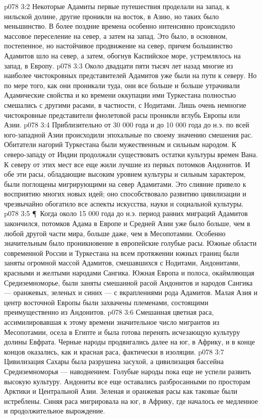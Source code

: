 \vs p078 3:2 Некоторые Адамиты первые путешествия проделали на запад, к нильской долине, другие проникли на восток, в Азию, но таких было меньшинство. В более поздние времена особенно интенсивно происходило массовое переселение на север, а затем на запад. Это было, в основном, постепенное, но настойчивое продвижение на север, причем большинство Адамитов шло на север, а затем, обогнув Каспийское море, устремлялось на запад, в Европу.
\vs p078 3:3 Около двадцати пяти тысяч лет назад многие из наиболее чистокровных представителей Адамитов уже были на пути к северу. Но по мере того, как они проникали туда, они все больше и больше утрачивали Адамические свойства и ко времени оккупации ими Туркестана полностью смешались с другими расами, в частности, с Нодитами. Лишь очень немногие чистокровные представители фиолетовой расы проникли вглубь Европы или Азии.
\vs p078 3:4 Приблизительно от 30 000 года и до 10 000 года до н.э. по всей юго\hyp{}западной Азии происходили эпохальные по своему значению смешения рас. Обитатели нагорий Туркестана были мужественным и сильным народом. К северо\hyp{}западу от Индии продолжали существовать остатки культуры времен Вана. К северу от этих мест все еще жили лучшие из первых потомков Андонитов. И обе эти расы, обладающие высоким уровнем культуры и сильным характером, были поглощены мигрирующими на север Адамитами. Это слияние привело к восприятию многих новых идей; оно способствовало развитию цивилизации и чрезвычайно обогатило все аспекты искусства, науки и социальной культуры.
\vs p078 3:5 \P\ Когда около 15 000 года до н.э. период ранних миграций Адамитов закончился, потомков Адама в Европе и Средней Азии уже было больше, чем в любой другой части мира, больше даже, чем в Месопотамии. Особенно значительным было проникновение в европейские голубые расы. Южные области современной России и Туркестана на всем протяжении южных границ были заняты огромной массой Адамитов, смешавшихся с Нодитами, Андонитами, красными и желтыми народами Сангика. Южная Европа и полоса, окаймляющая Средиземноморье, были заняты смешанной расой Андонитов и народов Сангика --- оранжевых, зеленых и синих --- с вкраплениями рода Адамитов. Малая Азия и центр восточной Европы были захвачены племенами, состоящими преимущественно из Андонитов.
\vs p078 3:6 Смешанная цветная раса, ассимилировавшая к этому времени значительное число мигрантов из Месопотамии, осела в Египте и была готова перенять исчезающую культуру долины Евфрата. Черные народы продвигались далее на юг, в Африку, и в конце концов оказались, как и красная раса, фактически в изоляции.
\vs p078 3:7 Цивилизация Сахары была разрушена засухой, а цивилизация бассейна Средиземноморья --- наводнением. Голубые народы пока еще не успели развить высокую культуру. Андониты все еще оставались разбросанными по просторам Арктики и Центральной Азии. Зеленая и оранжевая расы как таковые были истреблены. Синяя раса мигрировала на юг, в Африку, где началось ее медленное и продолжительное вырождение.
